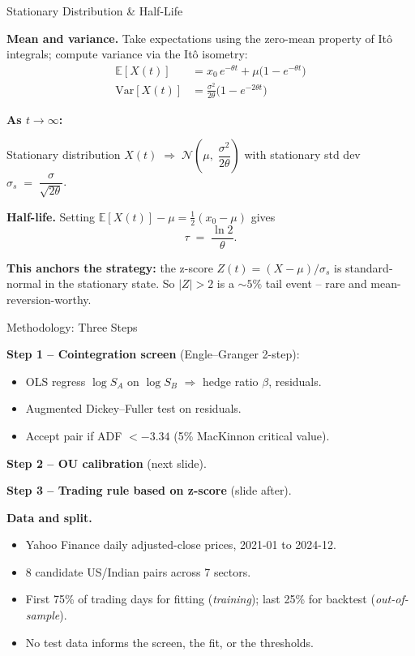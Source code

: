 \documentclass[10pt,aspectratio=169]{beamer}
\newcommand{\E}{\mathbb{E}}
\newcommand{\Var}{\mathrm{Var}}
\newcommand{\N}{\mathcal{N}}
\begin{document}
\begin{frame}{Stationary Distribution \& Half-Life}

\textbf{Mean and variance.} Take expectations using the zero-mean property
of It\^o integrals; compute variance via the It\^o isometry:
\begin{align*}
  \E[X(t)]   &= x_0\,e^{-\theta t} + \mu\bigl(1-e^{-\theta t}\bigr) \\
  \Var[X(t)] &= \frac{\sigma^2}{2\theta}\bigl(1 - e^{-2\theta t}\bigr)
\end{align*}

\textbf{As $t \to \infty$:}
\begin{block}{Stationary distribution}
\centering
$X(t) \;\Longrightarrow\; \N\!\left(\mu,\;\dfrac{\sigma^2}{2\theta}\right)$
\quad with stationary std dev \;
$\sigma_s \;=\; \dfrac{\sigma}{\sqrt{2\theta}}$.
\end{block}

\textbf{Half-life.} Setting $\E[X(t)]-\mu = \tfrac{1}{2}(x_0-\mu)$ gives
\[
\tau \;=\; \frac{\ln 2}{\theta}.
\]

\medskip
\textbf{This anchors the strategy:} the z-score $Z(t) = (X-\mu)/\sigma_s$
is standard-normal in the stationary state. So $|Z| > 2$ is a
$\sim 5\%$ tail event -- rare and mean-reversion-worthy.

\end{frame}

\begin{frame}{Methodology: Three Steps}

\textbf{Step 1 -- Cointegration screen} (Engle--Granger 2-step):
\begin{itemize}
  \item OLS regress $\log S_A$ on $\log S_B$ $\Rightarrow$ hedge ratio $\beta$, residuals.
  \item Augmented Dickey--Fuller test on residuals.
  \item Accept pair if ADF $< -3.34$ (5\% MacKinnon critical value).
\end{itemize}

\medskip
\textbf{Step 2 -- OU calibration} (next slide).

\medskip
\textbf{Step 3 -- Trading rule based on z-score} (slide after).

\bigskip
\textbf{Data and split.}
\begin{itemize}
  \item Yahoo Finance daily adjusted-close prices, 2021-01 to 2024-12.
  \item 8 candidate US/Indian pairs across 7 sectors.
  \item First 75\% of trading days for fitting (\emph{training});
        last 25\% for backtest (\emph{out-of-sample}).
  \item No test data informs the screen, the fit, or the thresholds.
\end{itemize}

\end{frame}
\end{document}
